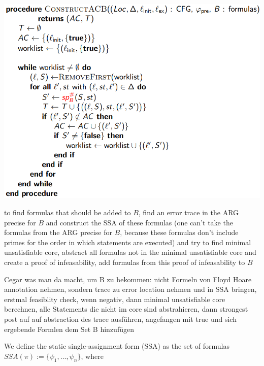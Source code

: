 \documentclass[a4paper]{article}
\begin{document}
\begin{minipage}[t]{0.16\linewidth}
\begin{betterlist}
{{\begin{betterlist}
					\includegraphics[width=0.7\linewidth]{./figures/ConstructACB.png}
					\item to find formulas that should be added to $B$, find an error trace in the ARG precise for $B$ and construct the SSA of these formulas (one can't take the formulas from the ARG precise for $B$, because these formulas don't include primes for the order in which statements are executed) and try to find minimal unsatisfiable core, abstract all formulas not in the minimal unsatisfiable core and create a proof of infeasability, add formulas from this proof of infeasability to $B$
					\begin{betterlist}
            \item \alert{Cegar was man da macht, um B zu bekommen:} nicht Formeln von Floyd Hoare annotation nehmen, sondern trace zu error location nehmen und in SSA bringen, erstmal feasiblity check, wenn negativ, dann minimal unsatisfiable core berechnen, alle Statements die nicht im core sind abstrahieren, dann strongest post auf auf abstraction des trace ausführen, angefangen mit true und sich ergebende Formlen dem Set B hinzufügen
						\item We define the \alert{static single-assignment form (SSA)} as the set of formulas $SSA(\pi) := \{\psi_1, \ldots, \psi_n\}$, where


\end{betterlist}
\end{betterlist}}}
\end{betterlist}
\end{minipage}
\end{document}
